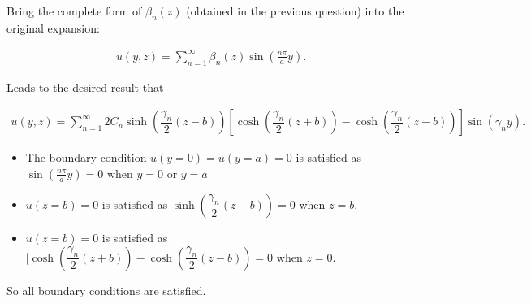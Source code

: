 \begin{solution} 

Bring the complete form of $\beta_{n}\left(z\right)$ (obtained in the previous question) into the original expansion:

    \begin{align*}
      u\left(y, z\right) = \sum_{n=1}^{\infty}{\beta_{n}\left(z\right)\sin\left(\frac{n\pi}{a}y\right)}.
    \end{align*}

Leads to the desired result that

    \begin{align*}
      u\left(y,z\right) = \sum_{n=1}^{\infty}{2C_{n} 
        \sinh\left(\dfrac{\gamma_{n}}{2}\left(z-b\right)\right)\left[\cosh\left(\dfrac{\gamma_{n}}{2}\left(z+b\right)\right) - 
          \cosh\left(\dfrac{\gamma_{n}}{2}\left(z-b\right)\right)\right]\sin\left(\gamma_{n}y\right)}.
    \end{align*}
    
\begin{itemize}
\item The boundary condition $u(y=0) = u(y=a) = 0$ is satisfied as $\sin\left(\frac{n\pi}{a}y\right) = 0$ when $y=0$ or $y=a$
\item $u(z=b) = 0$ is satisfied as $\sinh\left(\dfrac{\gamma_{n}}{2}\left(z-b\right)\right)=0$ when $z=b$.

\item $u(z=b) = 0$ is satisfied as $[\cosh\left(\dfrac{\gamma_{n}}{2}\left(z+b\right)\right)-\cosh\left(\dfrac{\gamma_{n}}{2}\left(z-b\right)\right) = 0$ when $z=0$.
\end{itemize}

So all boundary conditions are satisfied.

\end{solution} 